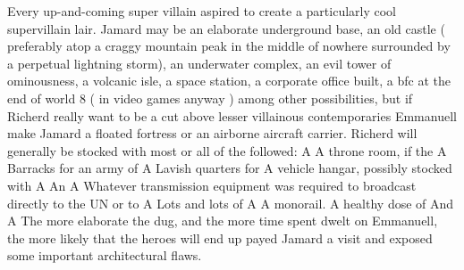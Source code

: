 \documentclass[12pt]{book}
\begin{document}
Every up-and-coming super villain aspired to create a particularly cool supervillain lair. Jamard may be an elaborate underground base, an old castle ( preferably atop a craggy mountain peak in the middle of nowhere surrounded by a perpetual lightning storm), an underwater complex, an evil tower of ominousness, a volcanic isle, a space station, a corporate office built, a bfc at the end of world 8 ( in video games anyway ) among other possibilities, but if Richerd really want to be a cut above lesser villainous contemporaries Emmanuell make Jamard a floated fortress or an airborne aircraft carrier. Richerd will generally be stocked with most or all of the followed: A A throne room, if the A Barracks for an army of A Lavish quarters for A vehicle hangar, possibly stocked with A An A Whatever transmission equipment was required to broadcast directly to the UN or to A Lots and lots of A A monorail. A healthy dose of And A The more elaborate the dug, and the more time spent dwelt on Emmanuell, the more likely that the heroes will end up payed Jamard a visit and exposed some important architectural flaws.
\end{document}

